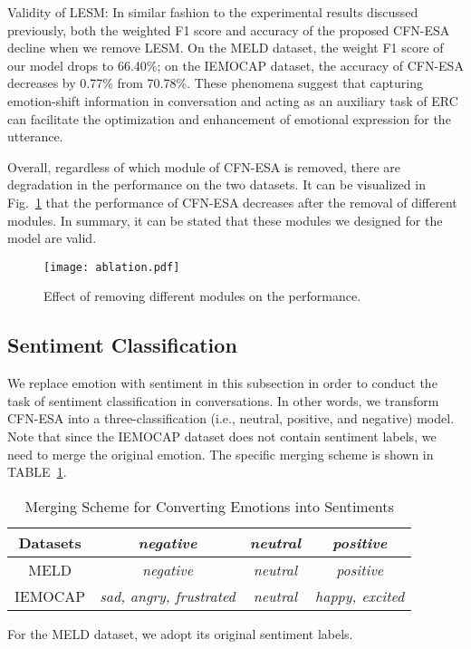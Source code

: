 \documentclass[journal]{IEEEtran}
\begin{document}
Validity of LESM: In similar fashion to the experimental results discussed previously, both the weighted F1 score and accuracy of the proposed CFN-ESA decline when we remove LESM. On the MELD dataset, the weight F1 score of our model drops to 66.40\%; on the IEMOCAP dataset, the accuracy of CFN-ESA decreases by 0.77\% from 70.78\%. These phenomena suggest that capturing emotion-shift information in conversation and acting as an auxiliary task of ERC can facilitate the optimization and enhancement of emotional expression for the utterance.

Overall, regardless of which module of CFN-ESA is removed, there are degradation in the performance on the two datasets. It can be visualized in Fig.~\ref{fig:ablation} that the performance of CFN-ESA decreases after the removal of different modules. In summary, it can be stated that these modules we designed for the model are valid.
\begin{figure}[htbp]
    \centering
    \texttt{[image: ablation.pdf]}
    \caption{Effect of removing different modules on the performance.}
    \label{fig:ablation}
\end{figure}

\subsection{Sentiment Classification}
We replace emotion with sentiment in this subsection in order to conduct the task of sentiment classification in conversations. In other words, we transform CFN-ESA into a three-classification (i.e., neutral, positive, and negative) model. Note that since the IEMOCAP dataset does not contain sentiment labels, we need to merge the original emotion. The specific merging scheme is shown in TABLE~\ref{tab:merging}.
\begin{table}[htbp]
    \centering
    \renewcommand{\arraystretch}{1.0}
    \setlength{\tabcolsep}{3pt}
    \caption{Merging Scheme for Converting Emotions into Sentiments}
    \begin{threeparttable}
    \begin{tabular}{c|ccc}
    \hline
    \textbf{Datasets} &\textit{negative} &\textit{neutral} &\textit{positive} \\
    \hline
	MELD &\textit{negative} &\textit{neutral} &\textit{positive}  \\
	IEMOCAP &\textit{sad, angry, frustrated} &\textit{neutral} &\textit{happy, excited} \\
    \hline
    \end{tabular}
    \begin{tablenotes}
        \footnotesize
        \item For the MELD dataset, we adopt its original sentiment labels.
    \end{tablenotes}
    \end{threeparttable}
    \label{tab:merging}
\end{table}
\end{document}
